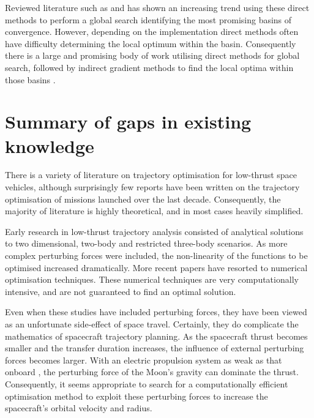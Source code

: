 Reviewed literature such as \textcite{Dachwald2005} and \textcite{Jackson2008} has shown an increasing trend using these direct methods to perform a global search identifying the most promising basins of convergence. However, depending on the implementation direct methods often have difficulty determining the local optimum within the basin. 
Consequently there is a large and promising body of work utilising direct methods for global search, followed by indirect gradient methods to find the local optima within those basins \parencite{Stryck1992, Kluever1995, Vasile2009, Yam2011}.






\section{Summary of gaps in existing knowledge}

There is a variety of literature on trajectory optimisation for low-thrust space vehicles, although surprisingly few reports have been written on the trajectory optimisation of missions launched over the last decade. Consequently, the majority of literature is highly theoretical, and in most cases heavily simplified. 

Early research in low-thrust trajectory analysis consisted of analytical solutions to two dimensional, two-body and restricted three-body scenarios. As more complex perturbing forces were included, the non-linearity of the functions to be optimised increased dramatically. More recent papers have resorted to numerical optimisation techniques. These numerical techniques are very computationally intensive, and are not guaranteed to find an optimal solution.

Even when these studies have included perturbing forces, they have been viewed as an unfortunate side-effect of space travel. Certainly, they do complicate the mathematics of spacecraft trajectory planning. As the spacecraft thrust becomes smaller and the transfer duration increases, the influence of external perturbing forces becomes larger. With an electric propulsion system as weak as that onboard \BW, the perturbing force of the Moon's gravity can dominate the thrust. Consequently, it seems appropriate to search for a computationally efficient optimisation method to exploit these perturbing forces to increase the spacecraft's orbital velocity and radius.

